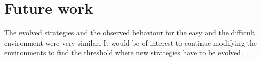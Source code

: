 
\section{Future work}
The evolved strategies and the observed behaviour for the easy and the difficult environment were very similar.
It would be of interest to continue modifying the environments to find the threshold where new strategies have to be evolved. 
